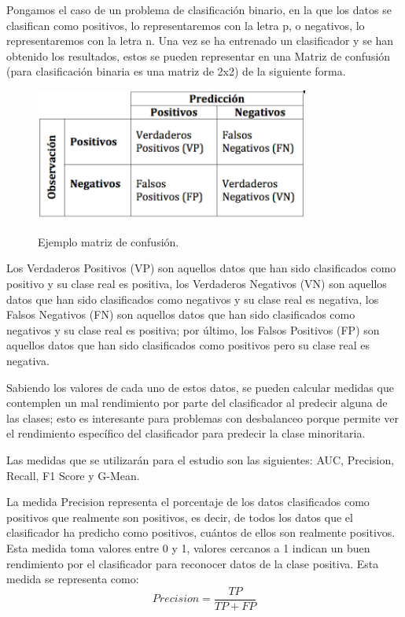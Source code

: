 Pongamos el caso de un problema de clasificación binario, en la que los datos se clasifican como positivos, lo representaremos con la letra p, o negativos, lo representaremos con la letra n. Una vez se ha entrenado un clasificador y se han obtenido los resultados, estos se pueden representar en una Matriz de confusión (para clasificación binaria es una matriz de 2x2) de la siguiente forma.\newline

\begin{figure}[h]
	\centering
	\includegraphics[width=90mm]{imagenes/conf-matrix.png}
	\label{fig:13}
	\caption{Ejemplo matriz de confusión.}
\end{figure}

Los Verdaderos Positivos (VP) son aquellos datos que han sido clasificados como positivo y su clase real es positiva, los Verdaderos Negativos (VN) son aquellos datos que han sido clasificados como negativos y su clase real es negativa, los Falsos Negativos (FN) son aquellos datos que han sido clasificados como negativos y su clase real es positiva; por último, los Falsos Positivos (FP) son aquellos datos que han sido clasificados como positivos pero su clase real es negativa.\newline

Sabiendo los valores de cada uno de estos datos, se pueden calcular medidas que contemplen un mal rendimiento por parte del clasificador al predecir alguna de las clases; esto es interesante para problemas con desbalanceo porque permite ver el rendimiento específico del clasificador para predecir la clase minoritaria.\newline

Las medidas que se utilizarán para el estudio son las siguientes: AUC, Precision, Recall, F1 Score y G-Mean.\newline

La medida Precision representa el porcentaje de los datos clasificados como positivos que realmente son positivos, es decir, de todos los datos que el clasificador ha predicho como positivos, cuántos de ellos son realmente positivos. Esta medida toma valores entre 0 y 1, valores cercanos a 1 indican un buen rendimiento por el clasificador para reconocer datos de la clase positiva. Esta medida se representa como:\newline
$$ Precision = \frac{TP}{TP + FP} $$

